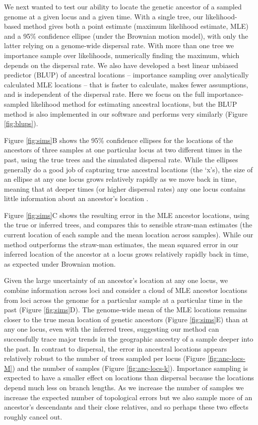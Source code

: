 \documentclass[12pt]{article}
\begin{document}
We next wanted to test our ability to locate the genetic ancestor of a sampled genome at a given locus and a given time. With a single tree, our likelihood-based method gives both a point estimate (maximum likelihood estimate, MLE) and a 95\% confidence ellipse (under the Brownian motion model), with only the latter relying on a genome-wide dispersal rate. With more than one tree we importance sample over likelihoods, numerically finding the maximum, which depends on the dispersal rate. We also have developed a best linear unbiased predictor (BLUP) of ancestral locations -- importance sampling over analytically calculated MLE locations -- that is faster to calculate, makes fewer assumptions, and is independent of the dispersal rate. Here we focus on the full importance-sampled likelihood method for estimating ancestral locations, but the BLUP method is also implemented in our software and performs very similarly (Figure \ref{fig:blups}).

Figure \ref{fig:sims}B shows the 95\% confidence ellipses for the locations of the ancestors of three samples at one particular locus at two different times in the past, using the true trees and the simulated dispersal rate. While the ellipses generally do a good job of capturing true ancestral locations (the `x's), the size of an ellipse at any one locus grows relatively rapidly as we move back in time, meaning that at deeper times (or higher dispersal rates) any one locus contains little information about an ancestor's location \citep[as is the case for ancestral state reconstruction in phylogenetics;][]{schluter1997likelihood}.

Figure \ref{fig:sims}C shows the resulting error in the MLE ancestor locations, using the true or inferred trees, and compares this to sensible straw-man estimates (the current location of each sample and the mean location across samples). While our method outperforms the straw-man estimates, the mean squared error in our inferred location of the ancestor at a locus grows relatively rapidly back in time, as expected under Brownian motion.

Given the large uncertainty of an ancestor's location at any one locus, we combine information across loci and consider a cloud of MLE ancestor locations from loci across the genome for a particular sample at a particular time in the past (Figure \ref{fig:sims}D). The genome-wide mean of the MLE locations remains closer to the true mean location of genetic ancestors (Figure \ref{fig:sims}E) than at any one locus, even with the inferred trees, suggesting our method can successfully trace major trends in the geographic ancestry of a sample deeper into the past. In contrast to dispersal, the error in ancestral locations appears relatively robust to the number of trees sampled per locus (Figure \ref{fig:anc-locs-M}) and the number of samples (Figure \ref{fig:anc-locs-k}). Importance sampling is expected to have a smaller effect on locations than dispersal because the locations depend much less on branch lengths. As we increase the number of samples we increase the expected number of topological errors but we also sample more of an ancestor's descendants and their close relatives, and so perhaps these two effects roughly cancel out.
\end{document}
